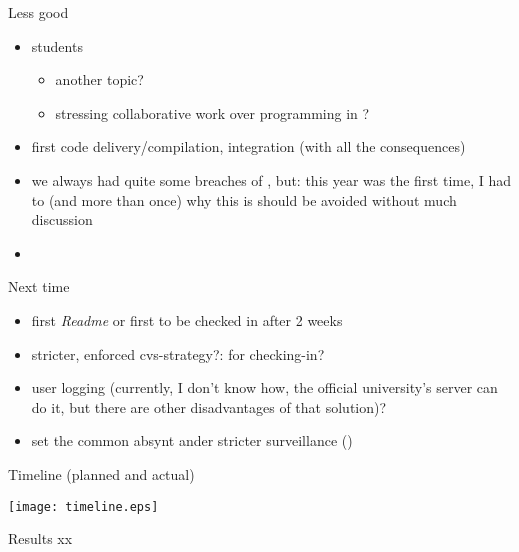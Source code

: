 \begin{myslide}{Less good}
  \begin{itemize}
  \item {} students
    \begin{itemize}
    \item another topic?
    \item stressing collaborative  work over programming in \Java?
    \end{itemize}
  \item {} first code delivery/compilation,
     integration (with all the consequences)
  \item we always had quite some breaches of , but:
    this year was the first time, I had to  (and more
    than once) why this is should be avoided without much discussion
  \item 
  \end{itemize}
  
\end{myslide}
\begin{myslide}{Next time}
  \begin{itemize}
  \item first \emph{Readme} or first 
     to be checked in after 2 weeks
  \item stricter, enforced cvs-strategy?:  for checking-in?
  \item user logging (currently, I don't know how, the official
    university's server can do it, but there are other disadvantages of
    that solution)?
  \item set the common absynt ander stricter surveillance
    ()
  \end{itemize}
\end{myslide}


\begin{myslide}{Timeline (planned and actual)}
  \begin{center}
    \texttt{[image: timeline.eps]}  
    \end{center}
\end{myslide}



\begin{myslide}{Results}
  xx
\end{myslide}


